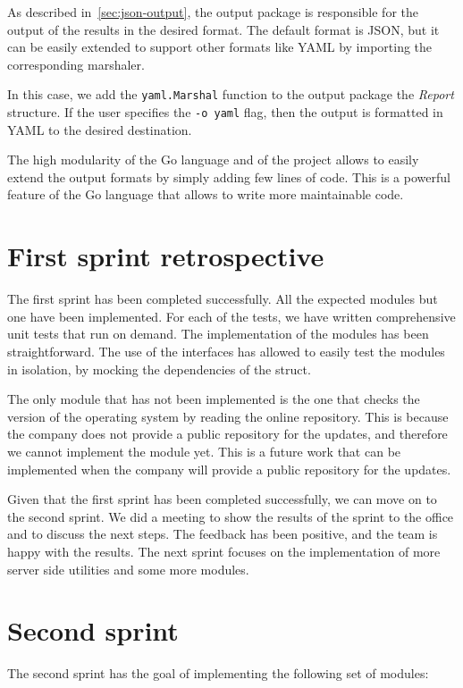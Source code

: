 As described in~\cref{sec:json-output}, the output package is responsible for the output of the results in the desired format. The default format is JSON, but it can be easily extended to support other formats like YAML by importing the corresponding marshaler.

In this case, we add the \texttt{yaml.Marshal} function to the output package the \textit{Report} structure. If the user specifies the \texttt{-o yaml} flag, then the output is formatted in YAML to the desired destination.

The high modularity of the Go language and of the project allows to easily extend the output formats by simply adding few lines of code. This is a powerful feature of the Go language that allows to write more maintainable code.

\section{First sprint retrospective}

The first sprint has been completed successfully. All the expected modules but one have been implemented. For each of the tests, we have written comprehensive unit tests that run on demand. The implementation of the modules has been straightforward. The use of the interfaces has allowed to easily test the modules in isolation, by mocking the dependencies of the struct.

The only module that has not been implemented is the one that checks the version of the operating system by reading the online repository. This is because the company does not provide a public repository for the updates, and therefore we cannot implement the module yet. This is a future work that can be implemented when the company will provide a public repository for the updates.

Given that the first sprint has been completed successfully, we can move on to the second sprint. We did a meeting to show the results of the sprint to the office and to discuss the next steps. The feedback has been positive, and the team is happy with the results. The next sprint focuses on the implementation of more server side utilities and some more modules.

\section{Second sprint}

The second sprint has the goal of implementing the following set of modules:

